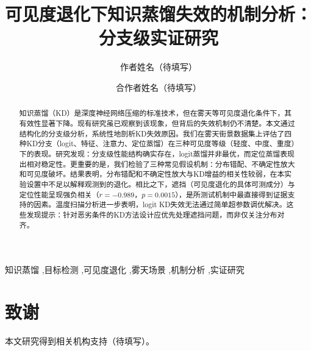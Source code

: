 \documentclass[preprint,12pt]{elsarticle}
\begin{document}
\begin{frontmatter}

\title{可见度退化下知识蒸馏失效的机制分析：分支级实证研究}

\author[1]{作者姓名（待填写）}

\author[1]{合作者姓名（待填写）}

\address[1]{单位地址（待填写）}

\begin{abstract}
知识蒸馏（KD）是深度神经网络压缩的标准技术，但在雾天等可见度退化条件下，其有效性显著下降。现有研究虽已观察到该现象，但背后的失效机制仍不清楚。本文通过结构化的分支级分析，系统性地剖析KD失效原因。我们在雾天街景数据集上评估了四种KD分支（logit、特征、注意力、定位蒸馏）在三种可见度等级（轻度、中度、重度）下的表现。研究发现：分支级性能结构确实存在，logit蒸馏并非最优，而定位蒸馏表现出相对稳定性。更重要的是，我们检验了三种常见假设机制：分布错配、不确定性放大和可见度破坏。结果表明，分布错配和不确定性放大与KD增益的相关性较弱，在本实验设置中不足以解释观测到的退化。相比之下，遮挡（可见度退化的具体可测成分）与定位性能呈现强负相关（$r=-0.989$，$p=0.0015$），是所测试机制中最直接得到证据支持的因素。温度扫描分析进一步表明，logit KD失效无法通过简单超参数调优解决。这些发现提示：针对恶劣条件的KD方法设计应优先处理遮挡问题，而非仅关注分布对齐。
\end{abstract}

\begin{keyword}
知识蒸馏 \sep 目标检测 \sep 可见度退化 \sep 雾天场景 \sep 机制分析 \sep 实证研究
\end{keyword}

\end{frontmatter}









\section*{致谢}
本文研究得到相关机构支持（待填写）。



\end{document}
